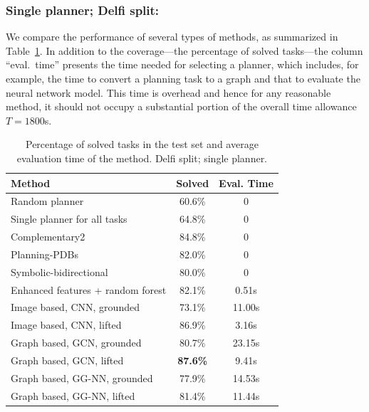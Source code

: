 \documentclass[letterpaper]{article} %
\begin{document}
\subsubsection{Single planner; Delfi split:} We compare the performance of several types of methods, as summarized in Table~\ref{tab:compare.baseline}. 
%
In addition to the coverage---the percentage of solved tasks---the column ``eval.\ time'' presents the time needed for selecting a planner, which includes, for example, the time to convert a planning task to a graph and that to evaluate the neural network model. This time is overhead and hence for any reasonable method, it should not occupy a substantial portion of the overall time allowance $T=1800$s.


\begin{table}[ht]
\centering
\caption{Percentage of solved tasks in the test set and average evaluation time of the method. Delfi split; single planner.}
\label{tab:compare.baseline}
\begin{tabular}{lcc}
\hline
Method & Solved & Eval. Time \\
\hline
Random planner               & 60.6\% & 0 \\
Single planner for all tasks & 64.8\% & 0 \\
\hline
Complementary2               & 84.8\% & 0\\
Planning-PDBs                & 82.0\% & 0\\
Symbolic-bidirectional       & 80.0\% & 0\\
\hline
Enhanced features + random forest & 82.1\% & 0.51s\\
\hline
Image based, CNN, grounded   & 73.1\% & 11.00s \\
Image based, CNN, lifted     & 86.9\% & 3.16s \\
Graph based, GCN, grounded   & 80.7\% & 23.15s\\
Graph based, GCN, lifted     & \textbf{87.6\%} & 9.41s\\
Graph based, GG-NN, grounded & 77.9\% & 14.53s\\
Graph based, GG-NN, lifted   & 81.4\% & 11.44s\\
\hline
\end{tabular}
\end{table}
\end{document}
